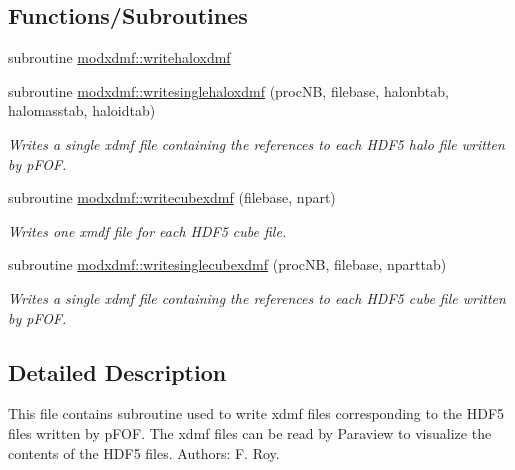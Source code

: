 \subsection*{Functions/\+Subroutines}
\begin{DoxyCompactItemize}
\item 
subroutine \hyperlink{namespacemodxdmf_ae2f7d2597902a070b71c0f7e57a1fd94}{modxdmf\+::writehaloxdmf}
\item 
subroutine \hyperlink{namespacemodxdmf_ab794d1f6abf632c9ff4279bec51e13b1}{modxdmf\+::writesinglehaloxdmf} (proc\+NB, filebase, halonbtab, halomasstab, haloidtab)
\begin{DoxyCompactList}\small\item\em Writes a single xdmf file containing the references to each H\+D\+F5 halo file written by p\+F\+OF. \end{DoxyCompactList}\item 
subroutine \hyperlink{namespacemodxdmf_a72e8949508c9724a4993f8f43447a1ea}{modxdmf\+::writecubexdmf} (filebase, npart)
\begin{DoxyCompactList}\small\item\em Writes one xmdf file for each H\+D\+F5 cube file. \end{DoxyCompactList}\item 
subroutine \hyperlink{namespacemodxdmf_ae843cb42b7f4598f934c91195facf470}{modxdmf\+::writesinglecubexdmf} (proc\+NB, filebase, nparttab)
\begin{DoxyCompactList}\small\item\em Writes a single xdmf file containing the references to each H\+D\+F5 cube file written by p\+F\+OF. \end{DoxyCompactList}\end{DoxyCompactItemize}


\subsection{Detailed Description}
This file contains subroutine used to write xdmf files corresponding to the H\+D\+F5 files written by p\+F\+OF. The xdmf files can be read by Paraview to visualize the contents of the H\+D\+F5 files. Authors\+: F. Roy. 

